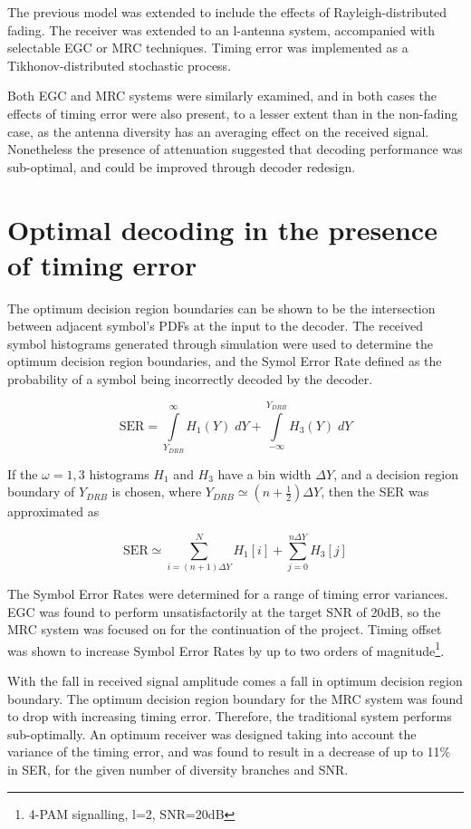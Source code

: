 The previous model was extended to include the effects of Rayleigh-distributed fading. The receiver was extended to an l-antenna system, accompanied with selectable EGC or MRC techniques. Timing error was implemented as a Tikhonov-distributed stochastic process.

Both EGC and MRC systems were similarly examined, and in both cases the effects of timing error were also present, to a lesser extent than in the non-fading case, as the antenna diversity has an averaging effect on the received signal. Nonetheless the presence of attenuation suggested that decoding performance was sub-optimal, and could be improved through decoder redesign.

\section{Optimal decoding in the presence of timing error}

The optimum decision region boundaries can be shown to be the intersection between adjacent symbol's PDFs at the input to the decoder. The received symbol histograms generated through simulation were used to determine the optimum decision region boundaries, and the Symol Error Rate defined as the probability of a symbol being incorrectly decoded by the decoder.

\[
\text{SER} = \int\limits_{Y_{DRB}}^{\infty} H_1 (Y) \; dY + \int\limits_{- \infty}^{Y_{DRB}} H_3 (Y) \; dY
\]

If the $\omega = 1, 3$ histograms $H_1$ and $H_3$ have a bin width $\Delta Y$, and a decision region boundary of $Y_{DRB}$ is chosen, where $Y_{DRB} \simeq (n + \frac{1}{2}) \Delta Y$, then the SER was approximated as

\[
\text{SER} \simeq \sum\limits_{i = (n+1) \Delta Y}^{N} H_1 [i] + \sum\limits_{j = 0}^{n \Delta Y} H_3 [j]
\]

The Symbol Error Rates were determined for a range of timing error variances. EGC was found to perform unsatisfactorily at the target SNR of 20dB, so the MRC system was focused on for the continuation of the project.  Timing offset was shown to increase Symbol Error Rates by up to two orders of magnitude\footnote{4-PAM signalling, l=2, SNR=20dB}.

With the fall in received signal amplitude comes a fall in optimum decision region boundary. The optimum decision region boundary for the MRC system was found to drop with increasing timing error. Therefore, the traditional system performs sub-optimally. An optimum receiver was designed taking into account the variance of the timing error, and was found to result in a decrease of up to 11\% in SER, for the given number of diversity branches and SNR.

